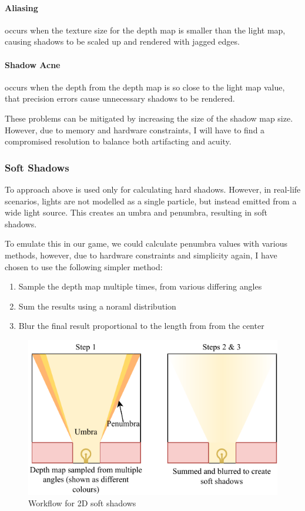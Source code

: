 \documentclass[../main/main.tex]{subfiles}
\begin{document}
\paragraph{Aliasing} occurs when the texture size for the depth map is smaller than the light map, causing shadows to be scaled up and rendered with jagged edges.

\paragraph{Shadow Acne} occurs when the depth from the depth map is so close to the light map value, that precision errors cause unnecessary shadows to be rendered.

\bigskip

\noindent These problems can be mitigated by increasing the size of the shadow map size. However, due to memory and hardware constraints, I will have to find a compromised resolution to balance both artifacting and acuity.

\subsubsection*{Soft Shadows}
To approach above is used only for calculating hard shadows. However, in real-life scenarios, lights are not modelled as a single particle, but instead emitted from a wide light source. This creates an umbra and penumbra, resulting in soft shadows.

To emulate this in our game, we could calculate penumbra values with various methods, however, due to hardware constraints and simplicity again, I have chosen to use the following simpler method:

\begin{enumerate}
\item Sample the depth map multiple times, from various differing angles
\item Sum the results using a noraml distribution
\item Blur the final result proportional to the length from from the center
\end{enumerate}

\begin{figure}[H]
    \centering
    \includegraphics[width=0.8\columnwidth]{../design/assets/soft_shadows.pdf}
    \caption{Workflow for 2D soft shadows}
    \label{fig:soft-shadows}
\end{figure}
\end{document}
